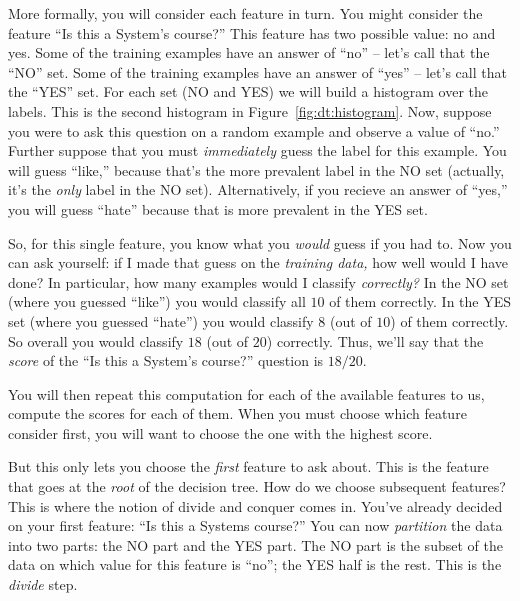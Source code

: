 More formally, you will consider each feature in turn.  You might
consider the feature ``Is this a System's course?''  This feature has
two possible value: no and yes.  Some of the training examples have an
answer of ``no'' -- let's call that the ``NO'' set.  Some of the
training examples have an answer of ``yes'' -- let's call that the
``YES'' set.  For each set (NO and YES) we will build a histogram over
the labels.  This is the second histogram in
Figure~\ref{fig:dt:histogram}.  Now, suppose you were to ask this
question on a random example and observe a value of ``no.''  Further
suppose that you must \emph{immediately} guess the label for this
example.  You will guess ``like,'' because that's the more prevalent
label in the NO set (actually, it's the \emph{only} label in the NO
set).  Alternatively, if you recieve an answer of ``yes,'' you will
guess ``hate'' because that is more prevalent in the YES set.

So, for this single feature, you know what you \emph{would} guess if
you had to.  Now you can ask yourself: if I made that guess on the
\emph{training data,} how well would I have done?  In particular, how
many examples would I classify \emph{correctly?}  In the NO set (where
you guessed ``like'') you would classify all $10$ of them correctly.
In the YES set (where you guessed ``hate'') you would classify $8$
(out of $10$) of them correctly.  So overall you would classify $18$
(out of $20$) correctly.  Thus, we'll say that the \emph{score} of the
``Is this a System's course?'' question is $18/20$.


You will then repeat this computation for each of the available
features to us, compute the scores for each of them.  When you must
choose which feature consider first, you will want to choose the one
with the highest score.

But this only lets you choose the \emph{first} feature to ask about.
This is the feature that goes at the \emph{root} of the decision tree.
How do we choose subsequent features?  This is where the notion of
divide and conquer comes in.  You've already decided on your first
feature: ``Is this a Systems course?''  You can now \emph{partition}
the data into two parts: the NO part and the YES part.  The NO part is
the subset of the data on which value for this feature is ``no''; the
YES half is the rest.  This is the \emph{divide} step.


